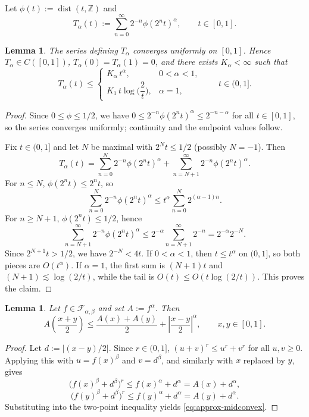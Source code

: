 \documentclass[11pt]{amsart}
\newtheorem{lemma}[theorem]{Lemma}
\theoremstyle{definition}
\renewcommand{\1}{{\mathbbm{1}}}
\begin{document}
Let $\phi(t):=\operatorname{dist}(t,\mathbb Z)$ and
\[
T_\alpha(t):=\sum_{n=0}^\infty 2^{-n}\phi(2^n t)^\alpha,
\qquad t\in[0,1].
\]

\begin{lemma}\label{lem:Takagi-growth}
The series defining $T_\alpha$ converges uniformly on $[0,1]$. Hence
$T_\alpha\in C([0,1])$, $T_\alpha(0)=T_\alpha(1)=0$, and there exists
$K_\alpha<\infty$ such that
\[
T_\alpha(t)\le
\begin{cases}
K_\alpha\, t^\alpha, & 0<\alpha<1,\\[2mm]
K_1\, t\log\!\bigl(\dfrac{2}{t}\bigr), & \alpha=1,
\end{cases}
\qquad t\in(0,1].
\]
\end{lemma}

\begin{proof}
Since $0\le \phi\le 1/2$, we have
$0\le 2^{-n}\phi(2^n t)^\alpha\le 2^{-n-\alpha}$ for all $t\in[0,1]$, so the
series converges uniformly; continuity and the endpoint values follow.

Fix $t\in(0,1]$ and let $N$ be maximal with $2^N t\le 1/2$ (possibly $N=-1$).
Then
\[
T_\alpha(t)
=
\sum_{n=0}^{N}2^{-n}\phi(2^n t)^\alpha
+
\sum_{n=N+1}^{\infty}2^{-n}\phi(2^n t)^\alpha.
\]
For $n\le N$, $\phi(2^n t)\le 2^n t$, so
\[
\sum_{n=0}^{N}2^{-n}\phi(2^n t)^\alpha
\le
t^\alpha\sum_{n=0}^{N}2^{(\alpha-1)n}.
\]
For $n\ge N+1$, $\phi(2^n t)\le 1/2$, hence
\[
\sum_{n=N+1}^{\infty}2^{-n}\phi(2^n t)^\alpha
\le
2^{-\alpha}\sum_{n=N+1}^{\infty}2^{-n}
=
2^{-\alpha}2^{-N}.
\]
Since $2^{N+1}t>1/2$, we have $2^{-N}<4t$. If $0<\alpha<1$, then
$t\le t^\alpha$ on $(0,1]$, so both pieces are $O(t^\alpha)$. If $\alpha=1$,
the first sum is $(N+1)t$ and $(N+1)\lesssim \log(2/t)$, while the tail is
$O(t)\le O(t\log(2/t))$. This proves the claim.
\end{proof}

\begin{lemma}\label{lem:reduce-midconvex}
Let $f\in\mathcal F_{\alpha,\beta}$ and set $A:=f^\alpha$. Then
\begin{equation}\label{eq:approx-midconvex}
A\!\left(\frac{x+y}{2}\right)
\le
\frac{A(x)+A(y)}{2}
+
\left|\frac{x-y}{2}\right|^\alpha,
\qquad x,y\in[0,1].
\end{equation}
\end{lemma}

\begin{proof}
Let $d:=|(x-y)/2|$. Since $r\in(0,1]$, $(u+v)^r\le u^r+v^r$ for all $u,v\ge0$.
Applying this with $u=f(x)^\beta$ and $v=d^\beta$, and similarly with $x$
replaced by $y$, gives
\[
\bigl(f(x)^\beta+d^\beta\bigr)^r\le f(x)^\alpha+d^\alpha=A(x)+d^\alpha,
\]
\[
\bigl(f(y)^\beta+d^\beta\bigr)^r\le f(y)^\alpha+d^\alpha=A(y)+d^\alpha.
\]
Substituting into the two-point inequality yields \eqref{eq:approx-midconvex}.
\end{proof}
\end{document}
